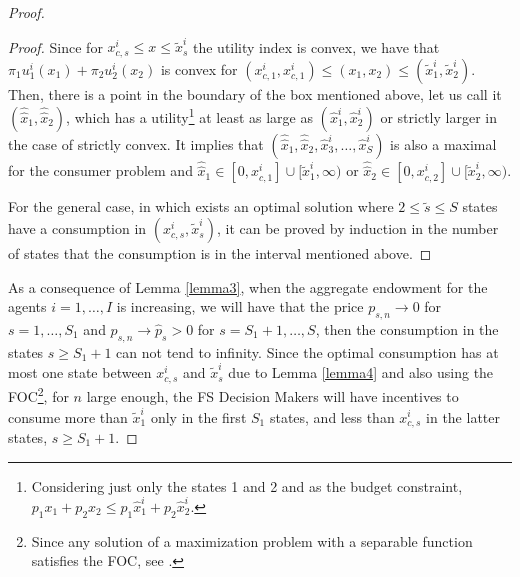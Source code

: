 \documentclass[pdftex]{article}
\numberwithin{equation}{section}
\theoremstyle{th}
\newtheorem{proof lemma}{{Proof Lemma}.}
\theoremstyle{definition}
\newtheorem*{risk lovers}{Risk lovers}
\newtheorem*{risk averse}{Risk averse}
\begin{document}
{\begin{proof}
\begin{proof}
Since for ${x}^i_{c,s}\leq{x}\leq\tilde{x}^i_s$ the utility index is convex, we have that $\pi_1u^i_1\left(x_1\right)+\pi_2u^i_2\left(x_2\right)$ is convex for $\left(x^i_{c,1},x^i_{c,1}\right)\leq\left(x_1,x_2\right)\leq\left(\tilde{x}^i_1,\tilde{x}^i_2\right)$. Then, there is a point in the boundary of the box mentioned above, let us call it $\left(\hat{\hat{x}}_1,\hat{\hat{x}}_2\right)$, which has a utility\footnote{Considering just only the states 1 and 2 and as the budget constraint, $p_1x_1+p_2x_2\leq{p}_1\hat{x}^i_1+p_2\hat{x}^i_2$.} at least as large as $(\hat{x}^i_1,\hat{x}^i_2)$ or strictly larger in the case of strictly convex. It implies that $\left(\hat{\hat{x}}_1,\hat{\hat{x}}_2,\hat{x}^i_3,\dots,\hat{x}^i_S\right)$ is also a maximal for the consumer problem and $\hat{\hat{x}}_1\in[0,x^i_{c,1}]\cup[\tilde{x}^i_1,\infty)$ or $\hat{\hat{x}}_2\in[0,x^i_{c,2}]\cup[\tilde{x}^i_2,\infty)$.

For the general case, in which exists an optimal solution where $2\leq\tilde{s}\leq{S}$ states have a consumption in $\left(x^i_{c,s},\tilde{x}^i_s\right)$, it can be proved by induction in the number of states that the consumption is in the interval mentioned above.
\end{proof}
As a consequence of Lemma \ref{lemma3}, when the aggregate endowment for the agents $i=1,\dots,I$ is increasing, we will have that the price $p_{s,n}\rightarrow0$ for $s=1,\dots,S_1$ and $p_{s,n}\rightarrow\hat{p}_s>0$ for $s=S_1+1,\dots,S$, then the consumption in the states $s\geq{S}_1+1$ can not tend to infinity. {Since the optimal consumption has at most one state between $x^i_{c,s}$ and $\tilde{x}^i_s$ due to Lemma \ref{lemma4} and also using the FOC\footnote{Since any solution of a maximization problem with a separable function satisfies the FOC, see \cite{IS}.}, for $n$ large enough, the FS Decision Makers will have incentives to consume more than $\tilde{x}^i_1$  only in the first $S_1$ states, and less than $x_{c,s}^i$ in the latter states, $s\geq{S_1}+1$.}


\end{proof}}
\end{document}
